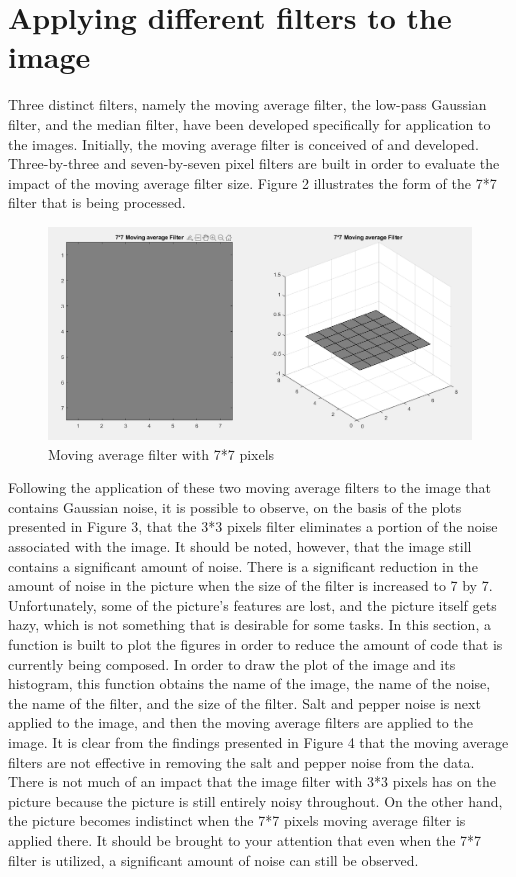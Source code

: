 \section{Applying different filters to the image}\label{P2}

Three distinct filters, namely the moving average filter, the low-pass Gaussian filter, and the median filter, have been developed specifically for application to the images. Initially, the moving average filter is conceived of and developed. Three-by-three and seven-by-seven pixel filters are built in order to evaluate the impact of the moving average filter size. Figure 2 illustrates the form of the 7*7 filter that is being processed.


\begin{figure} [ht]
    \centering
    \includegraphics[width = \textwidth]{Resources/Avg_filter.png}
    \caption{Moving average filter with 7*7 pixels}
    \label{fig:Moving Average Filter}
\end{figure}

Following the application of these two moving average filters to the image that contains Gaussian noise, it is possible to observe, on the basis of the plots presented in Figure 3, that the 3*3 pixels filter eliminates a portion of the noise associated with the image. It should be noted, however, that the image still contains a significant amount of noise. There is a significant reduction in the amount of noise in the picture when the size of the filter is increased to 7 by 7. Unfortunately, some of the picture's features are lost, and the picture itself gets hazy, which is not something that is desirable for some tasks. In this section, a function is built to plot the figures in order to reduce the amount of code that is currently being composed. In order to draw the plot of the image and its histogram, this function obtains the name of the image, the name of the noise, the name of the filter, and the size of the filter. 
Salt and pepper noise is next applied to the image, and then the moving average filters are applied to the image. It is clear from the findings presented in Figure 4 that the moving average filters are not effective in removing the salt and pepper noise from the data. There is not much of an impact that the image filter with 3*3 pixels has on the picture because the picture is still entirely noisy throughout. On the other hand, the picture becomes indistinct when the 7*7 pixels moving average filter is applied there. It should be brought to your attention that even when the 7*7 filter is utilized, a significant amount of noise can still be observed.

